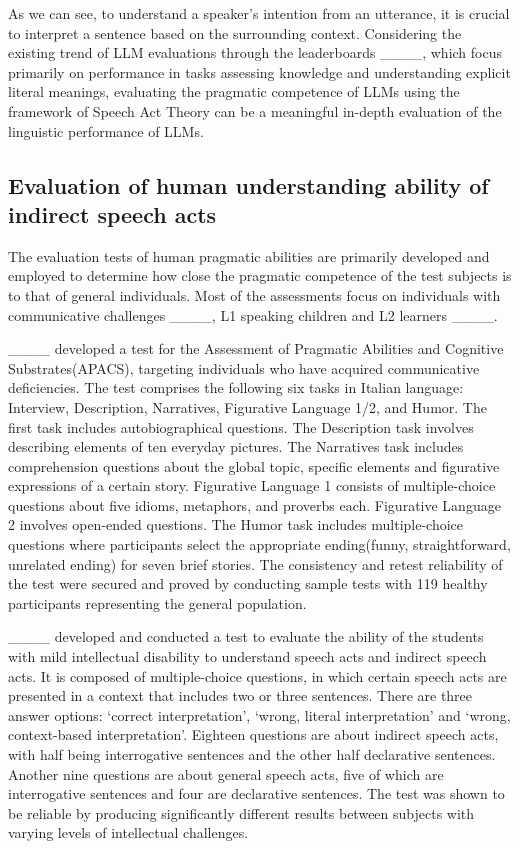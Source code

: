 As we can see, to understand a speaker’s intention from an utterance, it is crucial to interpret a sentence based on the surrounding context. Considering the existing trend of LLM evaluations through the leaderboards ____, which focus primarily on performance in tasks assessing knowledge and understanding explicit literal meanings, evaluating the pragmatic competence of LLMs using the framework of Speech Act Theory can be a meaningful in-depth evaluation of the linguistic performance of LLMs.


\subsection*{Evaluation of human understanding ability of indirect speech acts}
The evaluation tests of human pragmatic abilities are primarily developed and employed to determine how close the pragmatic competence of the test subjects is to that of general individuals. Most of the assessments focus on individuals with communicative challenges ____, L1 speaking children and L2 learners ____.

____ developed a test for the Assessment of Pragmatic Abilities and Cognitive Substrates(APACS), targeting individuals who have acquired communicative deficiencies. The test comprises the following six tasks in Italian language: Interview, Description, Narratives, Figurative Language 1/2, and Humor. The first task includes autobiographical questions. The Description task involves describing elements of ten everyday pictures. The Narratives task includes comprehension questions about the global topic, specific elements and figurative expressions of a certain story. Figurative Language 1 consists of multiple-choice questions about five idioms, metaphors, and proverbs each. Figurative Language 2 involves open-ended questions. The Humor task includes multiple-choice questions where participants select the appropriate ending(funny, straightforward, unrelated ending) for seven brief stories. The consistency and retest reliability of the test were secured and proved by conducting sample tests with 119 healthy participants representing the general population.

____ developed and conducted a test to evaluate the ability of the students with mild intellectual disability to understand speech acts and indirect speech acts. It is composed of multiple-choice questions, in which certain speech acts are presented in a context that includes two or three sentences. There are three answer options: ‘correct interpretation’, ‘wrong, literal interpretation’ and ‘wrong, context-based interpretation’. Eighteen questions are about indirect speech acts, with half being interrogative sentences and the other half declarative sentences. Another nine questions are about general speech acts, five of which are interrogative sentences and four are declarative sentences. The test was shown to be reliable by producing significantly different results between subjects with varying levels of intellectual challenges.

